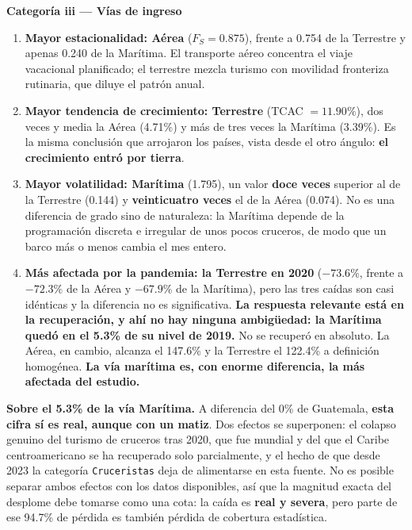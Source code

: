 \documentclass[12pt,letterpaper]{article}
\begin{document}
\textbf{Categoría iii --- Vías de ingreso}

\begin{enumerate}[label=\roman*.,leftmargin=1.8em,itemsep=4pt]
  \item \textbf{Mayor estacionalidad: Aérea} ($F_S = 0.875$), frente a 0.754 de la Terrestre y
  apenas 0.240 de la Marítima. El transporte aéreo concentra el viaje vacacional planificado;
  el terrestre mezcla turismo con movilidad fronteriza rutinaria, que diluye el patrón anual.
  \item \textbf{Mayor tendencia de crecimiento: Terrestre} (TCAC $= 11.90\%$), dos veces y media
  la Aérea (4.71\%) y más de tres veces la Marítima (3.39\%). Es la misma conclusión que
  arrojaron los países, vista desde el otro ángulo: \textbf{el crecimiento entró por tierra}.
  \item \textbf{Mayor volatilidad: Marítima} (1.795), un valor \textbf{doce veces} superior al
  de la Terrestre (0.144) y \textbf{veinticuatro veces} el de la Aérea (0.074). No es una
  diferencia de grado sino de naturaleza: la Marítima depende de la programación discreta e
  irregular de unos pocos cruceros, de modo que un barco más o menos cambia el mes entero.
  \item \textbf{Más afectada por la pandemia: la Terrestre en 2020} ($-73.6\%$, frente a
  $-72.3\%$ de la Aérea y $-67.9\%$ de la Marítima), pero las tres caídas son casi idénticas y
  la diferencia no es significativa. \textbf{La respuesta relevante está en la recuperación, y
  ahí no hay ninguna ambigüedad: la Marítima quedó en el 5.3\% de su nivel de 2019.} No se
  recuperó en absoluto. La Aérea, en cambio, alcanza el 147.6\% y la Terrestre el 122.4\% a
  definición homogénea. \textbf{La vía marítima es, con enorme diferencia, la más afectada del
  estudio.}
\end{enumerate}

\textbf{Sobre el 5.3\% de la vía Marítima.} A diferencia del 0\% de Guatemala, \textbf{esta
cifra sí es real, aunque con un matiz}. Dos efectos se superponen: el colapso genuino del
turismo de cruceros tras 2020, que fue mundial y del que el Caribe centroamericano se ha
recuperado solo parcialmente, y el hecho de que desde 2023 la categoría \texttt{Cruceristas}
deja de alimentarse en esta fuente. No es posible separar ambos efectos con los datos
disponibles, así que la magnitud exacta del desplome debe tomarse como una cota: la caída es
\textbf{real y severa}, pero parte de ese 94.7\% de pérdida es también pérdida de cobertura
estadística.
\end{document}
